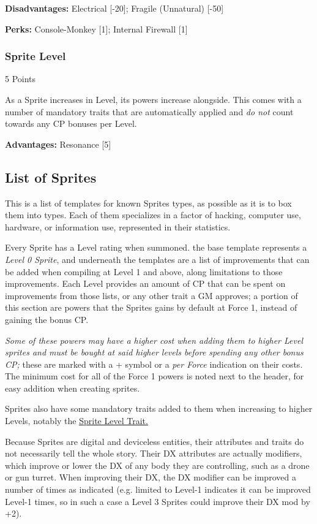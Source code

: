 \begin{multicols*}{3}
\textbf{Disadvantages:}
Electrical [-20]; Fragile (Unnatural) [-50]

\textbf{Perks:}
Console-Monkey [1]; Internal Firewall [1]

\subsubsection{Sprite Level}\label{sprite_level}
\begin{flushright}
	5 Points
\end{flushright}

As a Sprite increases in Level, its powers increase alongside. This comes with a number of mandatory traits that are automatically applied and \textit{do not} count towards any CP bonuses per Level.

\textbf{Advantages:}
Resonance [5]

\subsection{List of Sprites}

This is a list of templates for known Sprites types, as possible as it is to box them into types. Each of them specializes in a factor of hacking, computer use, hardware, or information use, represented in their statistics.

Every Sprite has a Level rating when summoned. the base template represents a \textit{Level 0 Sprite}, and underneath the templates are a list of improvements that can be added when compiling at Level 1 and above, along limitations to those improvements. Each Level provides an amount of CP that can be spent on improvements from those lists, or any other trait a GM approves; a portion of this section are powers that the Sprites gains by default at Force 1, instead of gaining the bonus CP. 

\textit{Some of these powers may have a higher cost when adding them to higher Level sprites and must be bought at said higher levels before spending any other bonus CP;} these are marked with a + symbol or a \textit{per Force} indication on their costs. The minimum cost for all of the Force 1 powers is noted next to the header, for easy addition when creating sprites.

Sprites also have some mandatory traits added to them when increasing to higher Levels, notably the \hyperref[sprite_level]{Sprite Level Trait.}

Because Sprites are digital and deviceless entities, their attributes and traits do not necessarily tell the whole story. Their DX attributes are actually modifiers, which improve or lower the DX of any body they are controlling, such as a drone or gun turret. When improving their DX, the DX modifier can be improved a number of times as indicated (e.g. limited to Level-1 indicates it can be improved Level-1 times, so in such a case a Level 3 Sprites could improve their DX mod by +2).


\end{multicols*}
